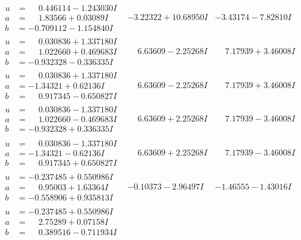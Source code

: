 \documentclass[1p]{elsarticle_modified}
\theoremstyle{definition}
\begin{document}
$$\begin{array}{c|c|c}
\begin{aligned}
u &= \phantom{-}0.446114 - 1.243030 I \\
a &= \phantom{-}1.83566 + 0.03089 I \\
b &= -0.709112 - 1.154840 I\end{aligned}
 & -3.22322 + 10.68950 I & -3.43174 - 7.82810 I \\ \hline\begin{aligned}
u &= \phantom{-}0.030836 + 1.337180 I \\
a &= \phantom{-}1.022660 + 0.469683 I \\
b &= -0.932328 - 0.336335 I\end{aligned}
 & \phantom{-}6.63609 - 2.25268 I & \phantom{-}7.17939 + 3.46008 I \\ \hline\begin{aligned}
u &= \phantom{-}0.030836 + 1.337180 I \\
a &= -1.34321 + 0.62136 I \\
b &= \phantom{-}0.917345 - 0.650827 I\end{aligned}
 & \phantom{-}6.63609 - 2.25268 I & \phantom{-}7.17939 + 3.46008 I \\ \hline\begin{aligned}
u &= \phantom{-}0.030836 - 1.337180 I \\
a &= \phantom{-}1.022660 - 0.469683 I \\
b &= -0.932328 + 0.336335 I\end{aligned}
 & \phantom{-}6.63609 + 2.25268 I & \phantom{-}7.17939 - 3.46008 I \\ \hline\begin{aligned}
u &= \phantom{-}0.030836 - 1.337180 I \\
a &= -1.34321 - 0.62136 I \\
b &= \phantom{-}0.917345 + 0.650827 I\end{aligned}
 & \phantom{-}6.63609 + 2.25268 I & \phantom{-}7.17939 - 3.46008 I \\ \hline\begin{aligned}
u &= -0.237485 + 0.550986 I \\
a &= \phantom{-}0.95003 + 1.63364 I \\
b &= -0.558906 + 0.935813 I\end{aligned}
 & -0.10373 - 2.96497 I & -1.46555 - 1.43016 I \\ \hline\begin{aligned}
u &= -0.237485 + 0.550986 I \\
a &= \phantom{-}2.75289 + 0.07158 I \\
b &= \phantom{-}0.389516 - 0.711934 I\end{aligned}

\end{array}$$
\end{document}
